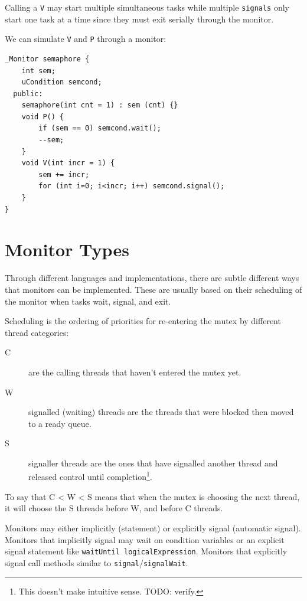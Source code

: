             Calling a \verb|V| may start multiple simultaneous tasks while multiple \verb|signals| only start one task at a time since they must exit serially through the monitor.

            We can simulate \verb|V| and \verb|P| through a monitor:
            \begin{lstlisting}
_Monitor semaphore {
    int sem;
    uCondition semcond;
  public:
    semaphore(int cnt = 1) : sem (cnt) {}
    void P() {
        if (sem == 0) semcond.wait();
        --sem;
    }
    void V(int incr = 1) {
        sem += incr;
        for (int i=0; i<incr; i++) semcond.signal();
    }
}
            \end{lstlisting}
        \section{Monitor Types} %
        \label{sec:monitor_types}
            Through different languages and implementations, there are subtle different ways that monitors can be implemented.
            These are usually based on their scheduling of the monitor when tasks wait, signal, and exit.

            Scheduling is the ordering of priorities for re-entering the mutex by different thread categories:
            \begin{description}
                \item[C] are the calling threads that haven't entered the mutex yet.
                \item[W] signalled (waiting) threads are the threads that were blocked then moved to a ready queue.
                \item[S] signaller threads are the ones that have signalled another thread and released control until completion\footnote{This doesn't make intuitive sense. TODO: verify.}.
            \end{description}
            To say that C < W < S means that when the mutex is choosing the next thread, it will choose the S threads before W, and before C threads.

            Monitors may either implicitly (statement) or explicitly signal (automatic signal).
            Monitors that implicitly signal may wait on condition variables or an explicit signal statement like \verb|waitUntil logicalExpression|.
            Monitors that explicitly signal call methods similar to \verb|signal|/\verb|signalWait|.

